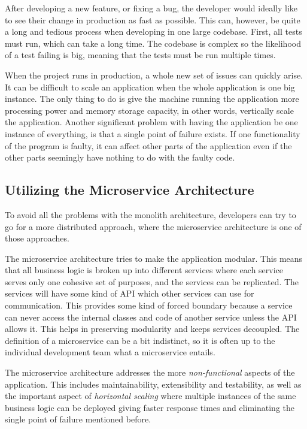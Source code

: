 After developing a new feature, or fixing a bug, the developer would ideally like to see their change 
in production as fast as possible. This can, however, be quite a long and tedious process when developing in one large codebase.
First, all tests must run, which can take a long time. The codebase is complex so the likelihood of a 
test failing is big, meaning that the tests must be run multiple times.

When the project runs in production, a whole new set of issues can quickly arise. It can be difficult
to scale an application when the whole application is one big instance.
The only thing to do is give the machine running the application more processing power and memory 
storage capacity, in other words, vertically scale the application. Another significant problem with having the application be one instance of everything, is that a single point of failure exists. If one functionality of the program is faulty, it can affect other parts of the application
even if the other parts seemingly have nothing to do with the faulty code.

\subsection{Utilizing the Microservice Architecture}
To avoid all the problems with the monolith architecture, developers can try to go for a more
 distributed approach, where the microservice architecture is one of those approaches.

The microservice architecture tries to make the application modular. This means that all business logic is broken up into different services 
where each service serves only one cohesive set of purposes, and the services can be replicated.
The services will have some kind of API which other services can use for communication. This provides some kind of forced boundary because a service can never access the internal classes and code of another service unless the API allows it.
This helps in preserving modularity and keeps services decoupled.
The definition of a microservice can be a bit indistinct, so it is often up to the individual development team what a microservice entails.

The microservice architecture addresses the more \textit{non-functional} aspects of the application.
This includes maintainability, extensibility and testability, as well as the important aspect of
\textit{horizontal scaling} where multiple instances of the same business logic can be deployed giving 
faster response times and eliminating the single point of failure mentioned before.

